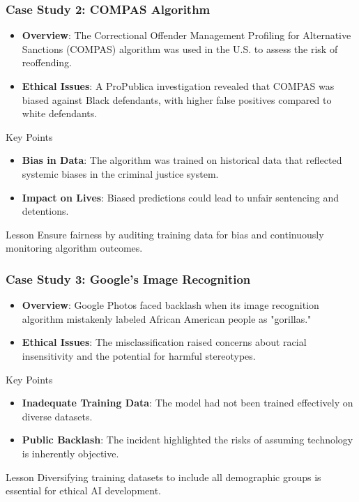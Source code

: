 \documentclass[aspectratio=169]{beamer}
\begin{document}
\begin{frame}[fragile]
    \frametitle{Case Study 2: COMPAS Algorithm}
    \begin{itemize}
        \item \textbf{Overview}: The Correctional Offender Management Profiling for Alternative Sanctions (COMPAS) algorithm was used in the U.S. to assess the risk of reoffending.
        \item \textbf{Ethical Issues}: A ProPublica investigation revealed that COMPAS was biased against Black defendants, with higher false positives compared to white defendants.
    \end{itemize}
    
    \begin{block}{Key Points}
        \begin{itemize}
            \item \textbf{Bias in Data}: The algorithm was trained on historical data that reflected systemic biases in the criminal justice system.
            \item \textbf{Impact on Lives}: Biased predictions could lead to unfair sentencing and detentions.
        \end{itemize}
    \end{block}
    
    \begin{block}{Lesson}
        Ensure fairness by auditing training data for bias and continuously monitoring algorithm outcomes.
    \end{block}
\end{frame}

\begin{frame}[fragile]
    \frametitle{Case Study 3: Google’s Image Recognition}
    \begin{itemize}
        \item \textbf{Overview}: Google Photos faced backlash when its image recognition algorithm mistakenly labeled African American people as "gorillas."
        \item \textbf{Ethical Issues}: The misclassification raised concerns about racial insensitivity and the potential for harmful stereotypes.
    \end{itemize}
    
    \begin{block}{Key Points}
        \begin{itemize}
            \item \textbf{Inadequate Training Data}: The model had not been trained effectively on diverse datasets.
            \item \textbf{Public Backlash}: The incident highlighted the risks of assuming technology is inherently objective.
        \end{itemize}
    \end{block}
    
    \begin{block}{Lesson}
        Diversifying training datasets to include all demographic groups is essential for ethical AI development.
    \end{block}
\end{frame}
\end{document}

